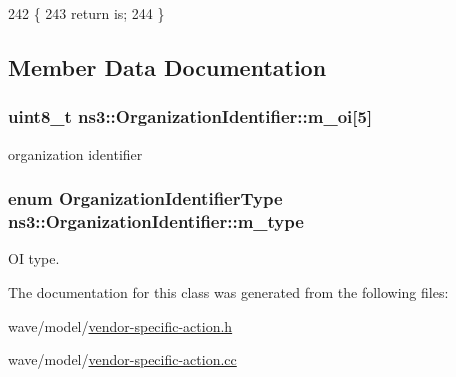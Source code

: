 \begin{DoxyCode}
242 \{
243   \textcolor{keywordflow}{return} is;
244 \}
\end{DoxyCode}


\subsection{Member Data Documentation}
\subsubsection[{\texorpdfstring{m\+\_\+oi}{m_oi}}]{\setlength{\rightskip}{0pt plus 5cm}uint8\+\_\+t ns3\+::\+Organization\+Identifier\+::m\+\_\+oi\mbox{[}5\mbox{]}\hspace{0.3cm}{\ttfamily [private]}}\hypertarget{classns3_1_1OrganizationIdentifier_ab0f1a9e4a1a40b0350fd5b52698a5dc7}{}\label{classns3_1_1OrganizationIdentifier_ab0f1a9e4a1a40b0350fd5b52698a5dc7}


organization identifier 

\subsubsection[{\texorpdfstring{m\+\_\+type}{m_type}}]{\setlength{\rightskip}{0pt plus 5cm}enum {\bf Organization\+Identifier\+Type} ns3\+::\+Organization\+Identifier\+::m\+\_\+type\hspace{0.3cm}{\ttfamily [private]}}\hypertarget{classns3_1_1OrganizationIdentifier_a5c49240c7eb405695bf6ccc6eda5e496}{}\label{classns3_1_1OrganizationIdentifier_a5c49240c7eb405695bf6ccc6eda5e496}


OI type. 



The documentation for this class was generated from the following files\+:\begin{DoxyCompactItemize}
\item 
wave/model/\hyperlink{vendor-specific-action_8h}{vendor-\/specific-\/action.\+h}\item 
wave/model/\hyperlink{vendor-specific-action_8cc}{vendor-\/specific-\/action.\+cc}\end{DoxyCompactItemize}

